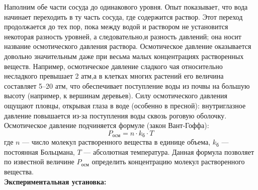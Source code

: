 \documentclass[a4paper, 12pt]{article}%
\begin{document}
		\begin{figure}[H]
	\end{figure}
 Наполним обе части сосуда до одинакового уровня. Опыт показывает, что вода начинает переходить в ту
	часть сосуда, где содержится раствор. Этот переход продолжается
	до тех пор, пока между водой и раствором не	установится некоторая
	разность уровней, а следовательно,и разность давлений; она носит название осмотического давления раствора. Осмотическое давление оказывается довольно значительным даже при весьма малых	концентрациях растворенных веществ. Например, осмотическое давление сладкого чая относительно несладкого
	превышает 2 атм,а в клетках многих растений его величина составляет 5–20 атм, что обеспечивает поступление воды из почвы на большую высоту (например,
	к вершинам деревьев). Силу осмотического давления ощущают пловцы, открывая глаза в воде (особенно в пресной): внутриглазное давление повышается из-за поступления воды сквозь роговую оболочку.
	Осмотическое давление подчиняется формуле (закон Вант-Гоффа):
	\begin{equation}
 P_{\text{осм}} = n\cdot k_{\text{б}}\cdot T 
\end{equation}
	где	$n$ — число молекул растворенного вещества в единице объема,
	$ k_{\text{б}}$ — постоянная Больцмана,
	$T$ — абсолютная температура. Данная формула позволяет по известной величине
	$P_{\text{осм}}$ определить	концентрацию молекул растворенного вещества.\\

    \textbf{Экспериментальная установка: }\\
    
\end{document}
